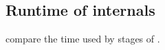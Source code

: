 \subsection{Runtime of \astarpa internals}\label{app:timing}
 compare the time used by stages of
\astarpa.
